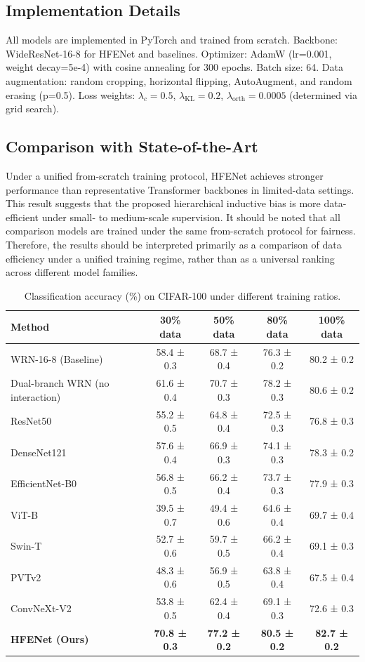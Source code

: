 \documentclass[pdflatex,sn-mathphys-num]{sn-jnl}
\theoremstyle{thmstyleone}%
\theoremstyle{thmstyletwo}%
\theoremstyle{thmstylethree}%
\begin{document}
\subsection{Implementation Details}
All models are implemented in PyTorch and trained from scratch. Backbone: WideResNet-16-8 for HFENet and baselines. Optimizer: AdamW (lr=0.001, weight decay=5e-4) with cosine annealing for 300 epochs. Batch size: 64. Data augmentation: random cropping, horizontal flipping, AutoAugment, and random erasing (p=0.5). Loss weights: $\lambda_c=0.5$, $\lambda_{\mathrm{KL}}=0.2$, $\lambda_{\mathrm{orth}}=0.0005$ (determined via grid search).

\subsection{Comparison with State-of-the-Art}
Under a unified from-scratch training protocol, HFENet achieves stronger performance than representative Transformer backbones in limited-data settings. 
This result suggests that the proposed hierarchical inductive bias is more data-efficient under small- to medium-scale supervision.
It should be noted that all comparison models are trained under the same from-scratch protocol for fairness. Therefore, the results should be interpreted primarily as a comparison of data efficiency under a unified training regime, rather than as a universal ranking across different model families.

\begin{table}[htbp]
    \centering
    \caption{Classification accuracy (\%) on CIFAR-100 under different training ratios.}
    \label{tab:cifar100_data_ratio}
    \begin{tabular}{@{}lcccc@{}}
    \toprule
    \textbf{Method} & \textbf{30\% data} & \textbf{50\% data} & \textbf{80\% data} & \textbf{100\% data} \\
    \midrule
    WRN-16-8 (Baseline) & 58.4 ± 0.3 & 68.7 ± 0.4 & 76.3 ± 0.2 & 80.2 ± 0.2 \\
    Dual-branch WRN (no interaction) & 61.6 ± 0.4 & 70.7 ± 0.3 & 78.2 ± 0.3 & 80.6 ± 0.2 \\
    ResNet50 & 55.2 ± 0.5 & 64.8 ± 0.4 & 72.5 ± 0.3 & 76.8 ± 0.3 \\
    DenseNet121 & 57.6 ± 0.4 & 66.9 ± 0.3 & 74.1 ± 0.3 & 78.3 ± 0.2 \\
    EfficientNet-B0 & 56.8 ± 0.5 & 66.2 ± 0.4 & 73.7 ± 0.3 & 77.9 ± 0.3 \\
    ViT-B & 39.5 ± 0.7 & 49.4 ± 0.6 & 64.6 ± 0.4 & 69.7 ± 0.4 \\
    Swin-T & 52.7 ± 0.6 & 59.7 ± 0.5 & 66.2 ± 0.4 & 69.1 ± 0.3 \\
    PVTv2 & 48.3 ± 0.6 & 56.9 ± 0.5 & 63.8 ± 0.4 & 67.5 ± 0.4 \\
    ConvNeXt-V2 & 53.8 ± 0.5 & 62.4 ± 0.4 & 69.1 ± 0.3 & 72.6 ± 0.3 \\
    \hline
    \textbf{HFENet (Ours)} & \textbf{70.8 ± 0.3} & \textbf{77.2 ± 0.2} & \textbf{80.5 ± 0.2} & \textbf{82.7 ± 0.2} \\
    \bottomrule
    \end{tabular}
\end{table}
\end{document}
